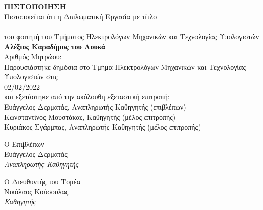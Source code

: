 \pagestyle{empty}
\begin{center}
{\LARGE \textbf{ΠΙΣΤΟΠΟΙΗΣΗ}\\[1cm]}
\large Πιστοποιείται ότι η Διπλωματική Εργασία με τίτλο\\[1cm]
\textbf{\large \thesistitlegr }\\[1cm]
του φοιτητή του Τμήματος Ηλεκτρολόγων Μηχανικών και Τεχνολογίας Υπολογιστών\\[1.5cm]
\textbf{\large Αλέξιος Καραδήμος του Λουκά }\\[0.5cm]
Αριθμός Μητρώου: \studnum\\[1.5cm]
Παρουσιάστηκε δημόσια στο Τμήμα Ηλεκτρολόγων Μηχανικών και Τεχνολογίας Υπολογιστών στις\\[0.5cm]
\Large{02/02/2022}\\[0.5cm]
και εξετάστηκε από την ακόλουθη εξεταστική επιτροπή:\\[0.5cm]
Ευάγγελος Δερματάς, Αναπληρωτής Καθηγητής (επιβλέπων)\\
Κωνσταντίνος Μουστάκας, Καθηγητής (μέλος επιτροπής)\\
Κυριάκος Σγάρμπας, Αναπληρωτής Καθηγητής (μέλος επιτροπής)\\
\end{center}

\vfill

\begin{minipage}{0.5\textwidth}
\begin{flushleft} \large
Ο Επιβλέπων\\[3cm]
Ευάγγελος Δερματάς \\
\emph{Αναπληρωτής Καθηγητής}
\end{flushleft}
\end{minipage}
\begin{minipage}{0.5\textwidth}
\begin{flushright} \large
Ο Διευθυντής του Τομέα\\[3cm]
Νικόλαος Κούσουλας\\
\emph{Καθηγητής}
\end{flushright}
\end{minipage}